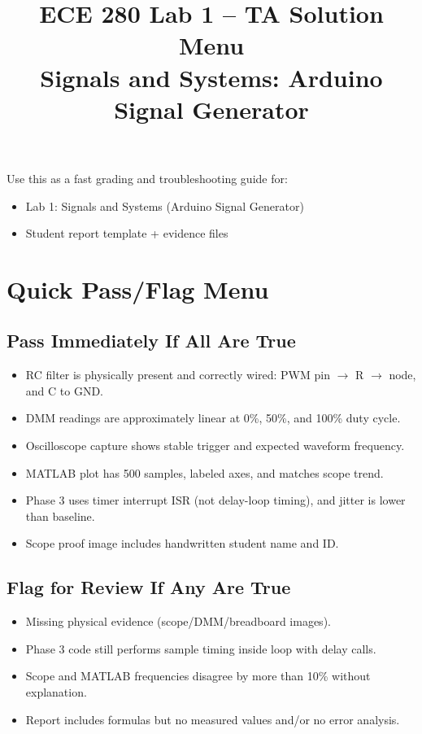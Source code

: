 \documentclass[11pt,letterpaper]{article}
\title{ECE 280 Lab 1 -- TA Solution Menu\\Signals and Systems: Arduino Signal Generator}
\author{}
\date{}
\begin{document}
\maketitle

Use this as a fast grading and troubleshooting guide for:
\begin{itemize}[leftmargin=1.2em]
    \item Lab 1: Signals and Systems (Arduino Signal Generator)
    \item Student report template + evidence files
\end{itemize}

\section{Quick Pass/Flag Menu}

\subsection*{Pass Immediately If All Are True}
\begin{itemize}[leftmargin=1.2em]
    \item RC filter is physically present and correctly wired: PWM pin $\to$ R $\to$ node, and C to GND.
    \item DMM readings are approximately linear at 0\%, 50\%, and 100\% duty cycle.
    \item Oscilloscope capture shows stable trigger and expected waveform frequency.
    \item MATLAB plot has 500 samples, labeled axes, and matches scope trend.
    \item Phase 3 uses timer interrupt ISR (not delay-loop timing), and jitter is lower than baseline.
    \item Scope proof image includes handwritten student name and ID.
\end{itemize}

\subsection*{Flag for Review If Any Are True}
\begin{itemize}[leftmargin=1.2em]
    \item Missing physical evidence (scope/DMM/breadboard images).
    \item Phase 3 code still performs sample timing inside loop with delay calls.
    \item Scope and MATLAB frequencies disagree by more than 10\% without explanation.
    \item Report includes formulas but no measured values and/or no error analysis.
\end{itemize}
\end{document}
